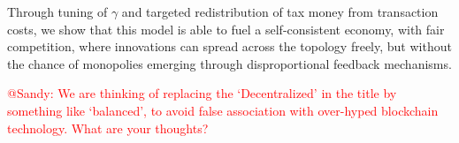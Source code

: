 \documentclass[a4paper,12pt]{article}
\newcommand{\red}[1]{\textcolor{red}{#1}} %
\begin{document}
Through tuning of $\gamma$ and targeted redistribution of tax money from transaction costs, we show that this model is able to fuel a self-consistent economy, 
with fair competition, where innovations can spread across the topology freely, but without the chance of monopolies emerging through disproportional feedback mechanisms. 

\red{
@Sandy: We are thinking of replacing the `Decentralized' in the title by something like `balanced', to avoid false association with over-hyped blockchain technology.
What are your thoughts?
}
\end{document}
